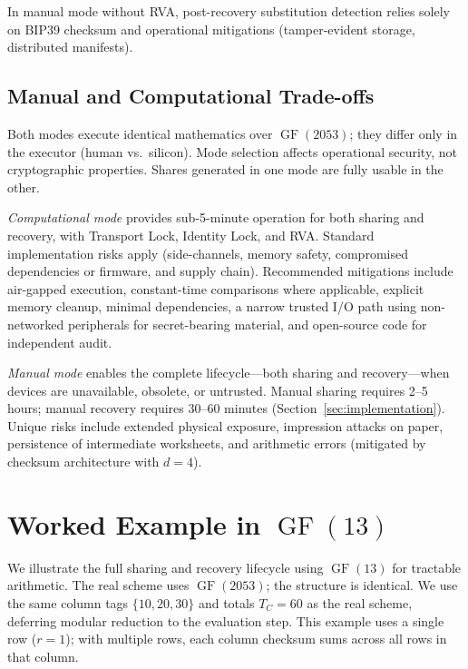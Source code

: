 \documentclass[11pt]{article}
\newcommand{\GF}{\operatorname{GF}}
\begin{document}
In manual mode without RVA, post-recovery substitution detection relies solely on BIP39 checksum and operational mitigations (tamper-evident storage, distributed manifests).

\subsection{Manual and Computational Trade-offs}

Both modes execute identical mathematics over $\GF(2053)$; they differ only in the executor (human vs.\ silicon). Mode selection affects operational security, not cryptographic properties. Shares generated in one mode are fully usable in the other.

\textit{Computational mode} provides sub-5-minute operation for both sharing and recovery, with Transport Lock, Identity Lock, and RVA. Standard implementation risks apply (side-channels, memory safety, compromised dependencies or firmware, and supply chain). Recommended mitigations include air-gapped execution, constant-time comparisons where applicable, explicit memory cleanup, minimal dependencies, a narrow trusted I/O path using non-networked peripherals for secret-bearing material, and open-source code for independent audit.

\textit{Manual mode} enables the complete lifecycle---both sharing and recovery---when devices are unavailable, obsolete, or untrusted. Manual sharing requires 2--5 hours; manual recovery requires 30--60 minutes (Section~\ref{sec:implementation}). Unique risks include extended physical exposure, impression attacks on paper, persistence of intermediate worksheets, and arithmetic errors (mitigated by checksum architecture with $d = 4$).

\section{\texorpdfstring{Worked Example in $\GF(13)$}{Worked Example in GF(13)}}
\label{sec:example}

We illustrate the full sharing and recovery lifecycle using $\GF(13)$ for tractable arithmetic. The real scheme uses $\GF(2053)$; the structure is identical. We use the same column tags $\{10, 20, 30\}$ and totals $T_C = 60$ as the real scheme, deferring modular reduction to the evaluation step. This example uses a single row ($r = 1$); with multiple rows, each column checksum sums across all rows in that column.
\end{document}
